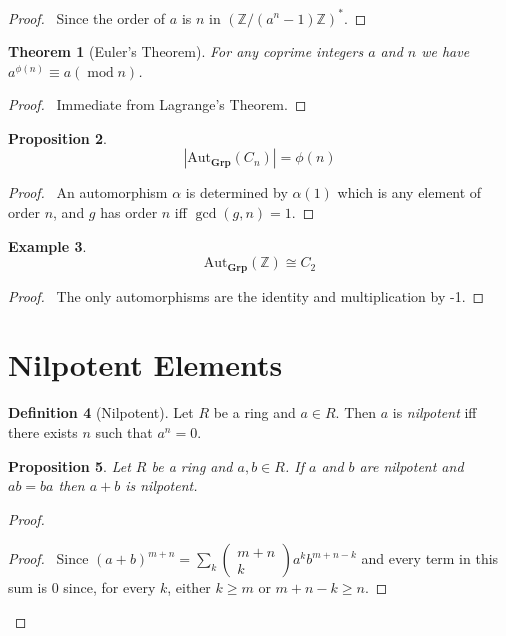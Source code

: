 \documentclass{book}
\let\qed\relax
\newtheorem{prop}{Proposition}[chapter]
\newtheorem{thm}[prop]{Theorem}
\theoremstyle{definition}
\newtheorem{df}[prop]{Definition}
\newtheorem{ex}[prop]{Example}
\newcommand{\Aut}[2]{\ensuremath{\mathrm{Aut}_{#1} \left( {#2} \right)}}
\newcommand{\Grp}{\ensuremath{\mathbf{Grp}}}
\renewcommand{\mod}{\ensuremath{\operatorname{mod}}}
\begin{document}
\begin{proof}
\pf\ Since the order of $a$ is $n$ in $(\mathbb{Z} / (a^n - 1)\mathbb{Z})^*$. \qed
\end{proof}

\begin{thm}[Euler's Theorem]
For any coprime integers $a$ and $n$ we have $a^{\phi(n)} \equiv a (\mod n)$.
\end{thm}

\begin{proof}
\pf\ Immediate from Lagrange's Theorem. \qed
\end{proof}

\begin{prop}
    \[ |\Aut{\Grp}{C_n}| = \phi(n) \]
\end{prop}

\begin{proof}
    \pf\ An automorphism $\alpha$ is determined by $\alpha(1)$ which is any element of order $n$, and $g$ has order $n$ iff $\gcd(g,n) = 1$. \qed
\end{proof}

\begin{ex}
    \[ \Aut{\Grp}{\mathbb{Z}} \cong C_2 \]
\end{ex}

\begin{proof}
    \pf\ The only automorphisms are the identity and multiplication by -1. \qed
\end{proof}

\section{Nilpotent Elements}

\begin{df}[Nilpotent]
Let $R$ be a ring and $a \in R$. Then $a$ is \emph{nilpotent} iff there exists $n$ such that $a^n = 0$.
\end{df}

\begin{prop}
Let $R$ be a ring and $a,b \in R$. If $a$ and $b$ are nilpotent and $ab = ba$ then $a + b$ is nilpotent.
\end{prop}

\begin{proof}
\pf
{}
\begin{proof}
	\pf\ Since $(a+b)^{m+n} = \sum_k \left( \begin{array}{c} m + n \\ k \end{array} \right) a^k b^{m+n-k}$ and every term in this sum is 0 since, for every $k$, either $k \geq m$ or $m+n-k \geq n$.
\end{proof}
\qed
\end{proof}
\end{document}
